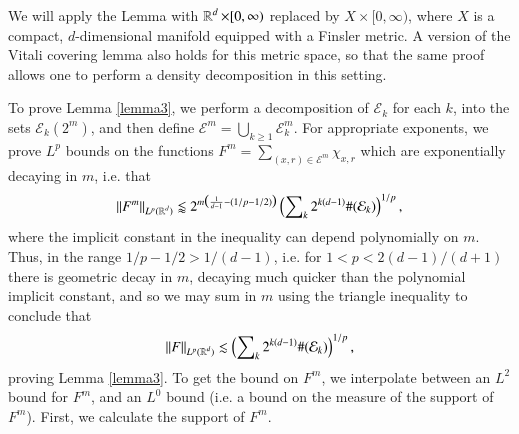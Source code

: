 \begin{remark}
  We will apply the Lemma with $\operatorname{\mathbb{R}}^d \times [0,\infty)$ replaced by $X \times [0,\infty)$, where $X$ is a compact, $d$-dimensional manifold equipped with a Finsler metric. A version of the Vitali covering lemma also holds for this metric space, so that the same proof allows one to perform a density decomposition in this setting.
\end{remark}

To prove Lemma \ref{lemma3}, we perform a decomposition of $\mathcal{E}_k$ for each $k$, into the sets $\mathcal{E}_k(2^m)$, and then define $\mathcal{E}^m = \bigcup_{k \geq 1} \mathcal{E}_k^m$. For appropriate exponents, we prove $L^p$ bounds on the functions $F^m = \sum\nolimits_{(x,r) \in \mathcal{E}^m} \chi_{x,r}$ which are exponentially decaying in $m$, i.e. that
%
\begin{equation}
  \| F^m \|_{L^p(\operatorname{\mathbb{R}}^d)} \lessapprox 2^{m \big( \frac{1}{d-1} - (1/p - 1/2) \big)} \left( \sum\nolimits_k 2^{k(d-1)} \#(\mathcal{E}_k) \right)^{1/p},
\end{equation}
where the implicit constant in the inequality can depend polynomially on $m$. Thus, in the range $1/p - 1/2 > 1/(d-1)$, i.e. for $1 < p < 2(d-1)/(d+1)$ there is geometric decay in $m$, decaying much quicker than the polynomial implicit constant, and so we may sum in $m$ using the triangle inequality to conclude that
%
\begin{equation}
  \| F \|_{L^p(\operatorname{\mathbb{R}}^d)} \lesssim \left( \sum\nolimits_k 2^{k(d-1)} \#(\mathcal{E}_k) \right)^{1/p},
\end{equation}
%
proving Lemma \ref{lemma3}. To get the bound on $F^m$, we interpolate between an $L^2$ bound for $F^m$, and an $L^0$ bound (i.e. a bound on the measure of the support of $F^m$). First, we calculate the support of $F^m$.

